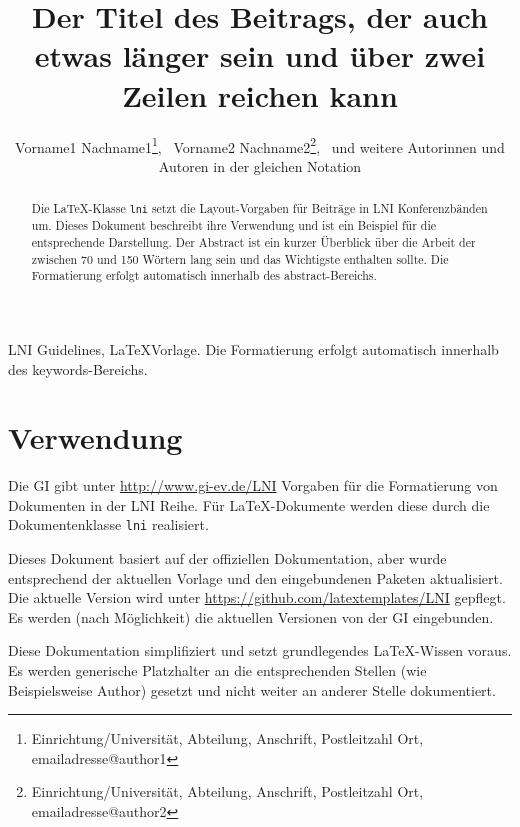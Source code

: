 \documentclass{lni}
\author{
Vorname1 Nachname1\footnote{Einrichtung/Universität, Abteilung, Anschrift, Postleitzahl Ort, emailadresse@author1}, \,
Vorname2 Nachname2\footnote{Einrichtung/Universität, Abteilung, Anschrift, Postleitzahl Ort, emailadresse@author2}, \,
und weitere Autorinnen und Autoren in der gleichen Notation}
\title{Der Titel des Beitrags, der auch etwas länger sein und über zwei Zeilen reichen kann}
\begin{document}
\maketitle

\thispagestyle{lnifirstpage}
\pagestyle{lni}

\setcounter{footnote}{2}

\begin{abstract}
Die \LaTeX-Klasse \texttt{lni} setzt die Layout-Vorgaben für Beiträge in LNI Konferenzbänden um.
Dieses Dokument beschreibt ihre Verwendung und ist ein Beispiel für die entsprechende Darstellung.
Der Abstract ist ein kurzer Überblick über die Arbeit der zwischen 70 und 150 Wörtern lang sein und das Wichtigste enthalten sollte.
Die Formatierung erfolgt automatisch innerhalb des abstract-Bereichs.
\end{abstract}

\begin{keywords}
LNI Guidelines, \LaTeX Vorlage. Die Formatierung erfolgt automatisch innerhalb des keywords-Bereichs.
\end{keywords}

\section{Verwendung}
Die GI gibt unter \url{http://www.gi-ev.de/LNI} Vorgaben für die Formatierung von Dokumenten in der LNI Reihe.
Für \LaTeX-Dokumente werden diese durch die Dokumentenklasse \texttt{lni} realisiert.

Dieses Dokument basiert auf der offiziellen Dokumentation, aber wurde entsprechend der aktuellen Vorlage und den eingebundenen Paketen aktualisiert.
Die aktuelle Version wird unter \url{https://github.com/latextemplates/LNI} gepflegt.
Es werden (nach Möglichkeit) die aktuellen Versionen von der GI eingebunden.

Diese Dokumentation simplifiziert und setzt grundlegendes LaTeX-Wissen voraus.
Es werden generische Platzhalter an die entsprechenden Stellen (wie Beispielsweise Author) gesetzt und nicht weiter an anderer Stelle dokumentiert.
\end{document}
